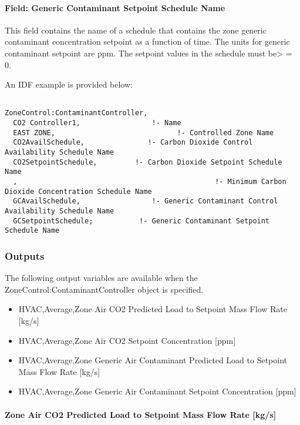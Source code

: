 \paragraph{Field: Generic Contaminant Setpoint Schedule Name}\label{field-generic-contaminant-setpoint-schedule-name}

This field contains the name of a schedule that contains the zone generic contaminant concentration setpoint as a function of time. The units for generic contaminant setpoint are ppm. The setpoint values in the schedule must be\textgreater{} = 0.

An IDF example is provided below:

\begin{lstlisting}

ZoneControl:ContaminantController,
  CO2 Controller1,                 !- Name
  EAST ZONE,                             !- Controlled Zone Name
  CO2AvailSchedule,               !- Carbon Dioxide Control Availability Schedule Name
  CO2SetpointSchedule,         !- Carbon Dioxide Setpoint Schedule Name
  ,                                               !- Minimum Carbon Dioxide Concentration Schedule Name
  GCAvailSchedule,                 !- Generic Contaminant Control Availability Schedule Name
  GCSetpointSchedule;           !- Generic Contaminant Setpoint Schedule Name
\end{lstlisting}

\subsubsection{Outputs}\label{outputs-4-020}

The following output variables are available when the ZoneControl:ContaminantController object is specified.

\begin{itemize}
\item
  HVAC,Average,Zone Air CO2 Predicted Load to Setpoint Mass Flow Rate {[}kg/s{]}
\item
  HVAC,Average,Zone Air CO2 Setpoint Concentration {[}ppm{]}
\item
  HVAC,Average,Zone Generic Air Contaminant Predicted Load to Setpoint Mass Flow Rate {[}kg/s{]}
\item
  HVAC,Average,Zone Generic Air Contaminant Setpoint Concentration {[}ppm{]}
\end{itemize}

\paragraph{Zone Air CO2 Predicted Load to Setpoint Mass Flow Rate {[}kg/s{]}}\label{zone-air-co2-predicted-load-to-setpoint-mass-flow-rate-kgs}

